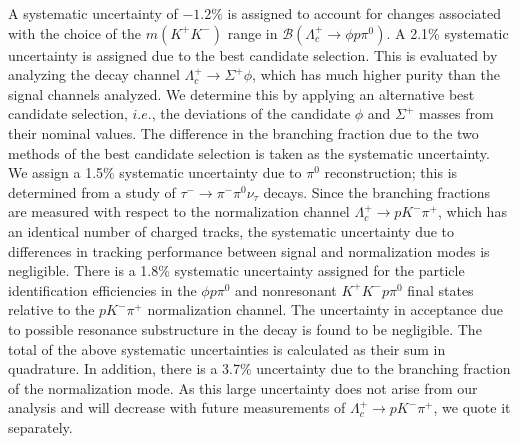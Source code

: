\documentclass[aps,prl,twocolumn,superscriptaddress,showpacs,preprintnumbers,amsmath,amssymb]{revtex4-1}
\begin{document}
A  systematic uncertainty of $-1.2\%$ is assigned to account for changes associated with the choice of the $m(K^+K^-)$ range in $\mathcal{B}(\Lambda_c^+\to \phi p\pi^0)$. 
A 2.1\% systematic uncertainty is assigned due to the  best candidate selection. This is evaluated  by analyzing the decay channel $\Lambda_c^+\to\Sigma^+\phi$, which has much higher purity than the signal channels analyzed. %
We determine this by applying an alternative best candidate selection, $i.e.$,  the deviations of the candidate $\phi$ and $\Sigma^+$ masses from their nominal values.  %
The difference in the branching fraction due to the two methods of the best candidate selection is taken as the systematic uncertainty.
We assign a 1.5\% systematic uncertainty due to $\pi^0$ reconstruction; this is determined from a study of $\tau^-\to\pi^-\pi^0\nu_{\tau}$ decays. Since the branching fractions are measured with respect to the normalization channel $\Lambda_c^+\to p K^-\pi^+$, which has an identical number of charged tracks, the systematic uncertainty due to differences in  tracking performance between signal and normalization modes is negligible. There is a 1.8\% systematic uncertainty assigned for the  particle identification efficiencies in the $\phi p\pi^0$ and nonresonant $K^+K^- p\pi^0$ final states relative to the $pK^-\pi^+$ normalization channel.  The uncertainty in acceptance due to possible resonance substructure in the decay is found to be negligible. The total of the above systematic uncertainties is calculated as their sum in quadrature. In addition, there is a 3.7\% uncertainty due to the branching fraction of the normalization mode. As this large uncertainty does not arise from our
analysis and  will decrease with future measurements of $\Lambda_c^+\to pK^-\pi^+$, we quote it separately. 
\end{document}
